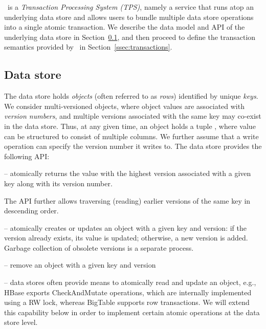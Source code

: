 

\sys\ is a \emph{Transaction Processing System (TPS)}, namely a service that runs atop an underlying data store and 
allows users to bundle multiple data store operations into a single atomic transaction. 
We describe the data model and API of the underlying data store in Section~\ref{ssec:data-model}, and 
then proceed to define  the transaction semantics provided by \sys\ in Section~\ref{ssec:transactions}. 

\subsection{Data store}
\label{ssec:data-model}

The  data store holds  \emph{objects} (often referred to as \emph{rows}) identified by unique \emph{keys}.
We consider multi-versioned objects, where object values are associated with \emph{version numbers}, and
multiple versions associated with the same key may co-exist in the data store.
Thus, at any given time, an object holds a tuple , where value
can be structured to consist of multiple columns.
We further assume that a write operation can specify the version number it writes to.
The  data store provides the following API:
\begin{description}
\item [] -- atomically returns the value with
the highest version associated with a given key along with its version number.
\item The API further allows traversing (reading) earlier versions of the same
key in descending order.
\item [\code{put}] -- atomically creates or updates an object with a given key and version:
if the version already exists, its value is updated;
otherwise, a new version is added. Garbage collection of obsolete versions is a separate
process.
\item [\code{remove}] -- remove an object with a given key and version
\item [\code{check\&mutate}] --  data stores often provide means to atomically read and
update an object, e.g., HBase exports CheckAndMutate operations, which are 
internally implemented using a RW lock, whereas BigTable supports row transactions. 
We will extend this capability below in order to implement certain atomic
operations at the data store level.
\end{description}


